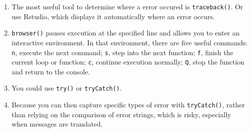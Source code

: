 
\begin{enumerate}
\def\labelenumi{\arabic{enumi}.}
\item
  The most useful tool to determine where a error occured is
  \texttt{traceback()}. Or use Rstudio, which displays it automatically
  where an error occurs.
\item
  \texttt{browser()} pauses execution at the specified line and allows
  you to enter an interactive environment. In that environment, there
  are five useful commands: \texttt{n}, execute the next command;
  \texttt{s}, step into the next function; \texttt{f}, finish the
  current loop or function; \texttt{c}, continue execution normally;
  \texttt{Q}, stop the function and return to the console.
\item
  You could use \texttt{try()} or \texttt{tryCatch()}.
\item
  Because you can then capture specific types of error with
  \texttt{tryCatch()}, rather than relying on the comparison of error
  strings, which is risky, especially when messages are translated.
\end{enumerate}
